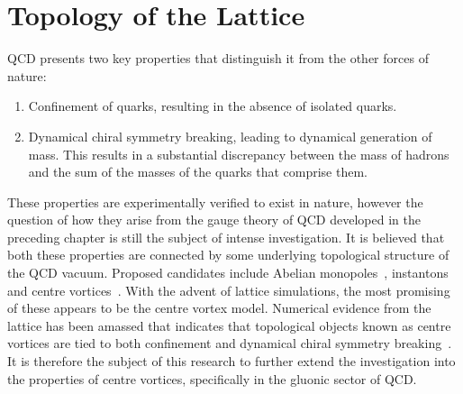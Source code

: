 \chapter{Topology of the Lattice}

\ifpdf
    \graphicspath{{Chapter3/Figs/Raster/}{Chapter3/Figs/PDF/}{Chapter3/Figs/}}
\else
    \graphicspath{{Chapter3/Figs/Vector/}{Chapter3/Figs/}}
\fi
QCD presents two key properties that distinguish it from the other forces of nature:
\begin{enumerate}
\item Confinement of quarks, resulting in the absence of isolated quarks.
\item Dynamical chiral symmetry breaking, leading to dynamical generation of mass. This results in a substantial discrepancy between the mass of hadrons and the sum of the masses of the quarks that comprise them.
\end{enumerate}
These properties are experimentally verified to exist in nature, however the question of how they arise from the gauge theory of QCD developed in the preceding chapter is still the subject of intense investigation. It is believed that both these properties are connected by some underlying topological structure of the QCD vacuum. Proposed candidates include Abelian monopoles~\cite{tHooft:1981bkw,Smit:1989vg,Matsubara:1993nq,Suzuki:1989gp,Mandelstam:1974pi,Kronfeld:1987ri}, instantons~\cite{Belavin:1975fg,Witten:1978bc,Callan:1977gz,Schafer:1996wv,Trewartha:2013qga,Aharonov:1978jd} and centre vortices~\cite{'tHooft:1977hy,'tHooft:1979uj,Feynman:1981ss,Aharonov:1978jd,Cornwall:1979hz,Nielsen:1979xu}. With the advent of lattice simulations, the most promising of these appears to be the centre vortex model. Numerical evidence from the lattice has been amassed that indicates that topological objects known as centre vortices are tied to both confinement and dynamical chiral symmetry breaking~\cite{Biddle:2018dtc,Faber:1997rp,Langfeld:1998cz,Bowman:2008qd,Trewartha:2015ida,Trewartha:2015nna,Trewartha:2017ive,DelDebbio:1996lih,Greensite:2003bk,DelDebbio:1998luz,OMalley:2011aa,Langfeld:2003ev}. It is therefore the subject of this research to further extend the investigation into the properties of centre vortices, specifically in the gluonic sector of QCD.\\

